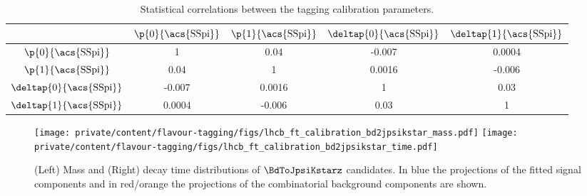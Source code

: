 \begin{table}
  \centering
  \caption{Statistical correlations between the \SSpi tagging calibration parameters. \cite{Aaij:2015vza}}
  \label{tab:flavour_tagging:calibration:ss:correlations}
  \begin{tabular}{ccccc}
    \toprule
    & $\p{0}{\text{\acs{SSpi}}}$ & $\p{1}{\text{\acs{SSpi}}}$ & $\deltap{0}{\text{\acs{SSpi}}}$ & $\deltap{1}{\text{\acs{SSpi}}}$ \\
    \midrule
    $\p{0}{\text{\acs{SSpi}}}$ & 1 & 0.04 & -0.007 & 0.0004 \\
    $\p{1}{\text{\acs{SSpi}}}$ & 0.04 & 1 & 0.0016 & -0.006 \\
    $\deltap{0}{\text{\acs{SSpi}}}$ & -0.007 & 0.0016 & 1 & 0.03 \\
    $\deltap{1}{\text{\acs{SSpi}}}$ & 0.0004 & -0.006 & 0.03 & 1 \\
    \bottomrule
  \end{tabular}
\end{table}
%
\begin{figure}[t]
  \texttt{[image: private/content/flavour-tagging/figs/lhcb\_ft\_calibration\_bd2jpsikstar\_mass.pdf]}
  \texttt{[image: private/content/flavour-tagging/figs/lhcb\_ft\_calibration\_bd2jpsikstar\_time.pdf]}
  \caption{(Left) Mass and (Right) decay time distributions of $\BdToJpsiKstarz$
  candidates. In blue the projections of the fitted signal components and in
  red/orange the projections of the combinatorial background components are
  shown. \cite{Aaij:2015vza}}
  \label{fig:flavour_tagging:calibration:ss:fit}
\end{figure}
%
